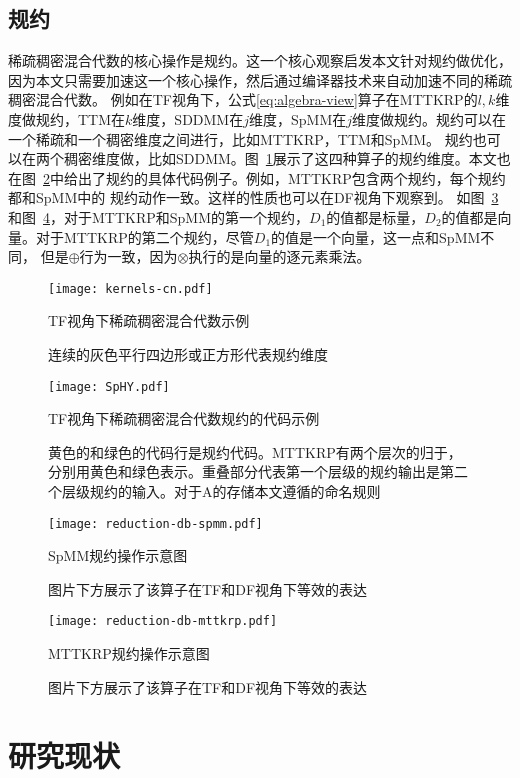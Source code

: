 \subsection{规约}\label{sec:reduction-core}
稀疏稠密混合代数的核心操作是规约。这一个核心观察启发本文针对规约做优化，因为本文只需要加速这一个核心操作，然后通过编译器技术来自动加速不同的稀疏稠密混合代数。
例如在TF视角下，公式\eqref{eq:algebra-view}算子在MTTKRP的$l,k$维度做规约，TTM在$k$维度，SDDMM在$j$维度，SpMM在$j$维度做规约。规约可以在一个稀疏和一个稠密维度之间进行，比如MTTKRP，TTM和SpMM。
规约也可以在两个稠密维度做，比如SDDMM。图~\ref{fig:kernels}展示了这四种算子的规约维度。本文也在图~\ref{fig:four-code}中给出了规约的具体代码例子。例如，MTTKRP包含两个规约，每个规约都和SpMM中的
规约动作一致。这样的性质也可以在DF视角下观察到。 如图~\ref{fig:redb-spmm}和图~\ref{fig:redb-mttkrp}，对于MTTKRP和SpMM的第一个规约，$D_1$的值都是标量，$D_2$的值都是向量。对于MTTKRP的第二个规约，尽管$D_1$的值是一个向量，这一点和SpMM不同，
但是$\oplus$行为一致，因为$\otimes$执行的是向量的逐元素乘法。
\begin{figure}[h]%
  \centering
  \texttt{[image: kernels-cn.pdf]}
  \caption{TF视角下稀疏稠密混合代数示例}
  \caption*{连续的灰色平行四边形或正方形代表规约维度}
  \label{fig:kernels}
\end{figure}
\begin{figure}[h]%
  \centering
  \texttt{[image: SpHY.pdf]}
  \caption{TF视角下稀疏稠密混合代数规约的代码示例}
  \caption*{黄色的和绿色的代码行是规约代码。MTTKRP有两个层次的归于，分别用黄色和绿色表示。重叠部分代表第一个层级的规约输出是第二个层级规约的输入。对于A的存储本文遵循\cite{kjolstad:2020:phd-thesis}的命名规则}
  \label{fig:four-code}
\end{figure}
\begin{figure}[h]%
  \centering
  \texttt{[image: reduction-db-spmm.pdf]}
  \caption{SpMM规约操作示意图}
  \caption*{图片下方展示了该算子在TF和DF视角下等效的表达}
  \label{fig:redb-spmm}
\end{figure}
\begin{figure}[h]%
  \centering
  \texttt{[image: reduction-db-mttkrp.pdf]}
  \caption{MTTKRP规约操作示意图}
  \caption*{图片下方展示了该算子在TF和DF视角下等效的表达}
  \label{fig:redb-mttkrp}
\end{figure}
\section{研究现状}
